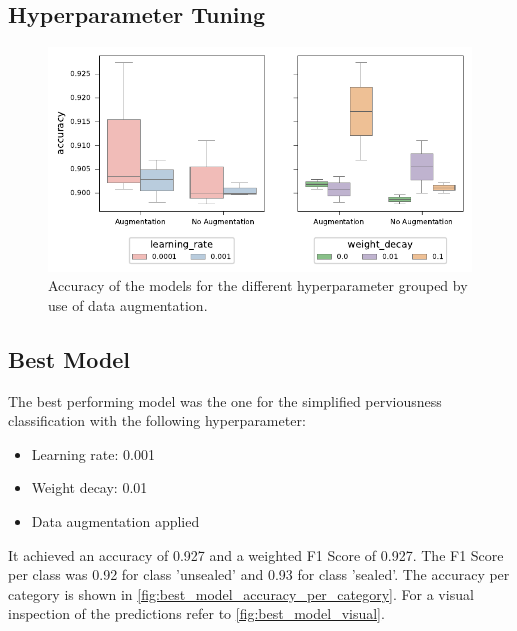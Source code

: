 \subsection{Hyperparameter Tuning}%

\begin{figure}[H]
    \centering
    \captionsetup{width=0.8\linewidth}
    \includegraphics{figures/hp_tuning_boxplot.pdf}
    \caption{Accuracy of the models for the different hyperparameter grouped by use of data augmentation.}
    \label{fig:hp_tuning_boxplot}
\end{figure}

\subsection{Best Model}%

The best performing model was the one for the simplified perviousness classification
with the following hyperparameter:
\begin{itemize}
    \item Learning rate: 0.001
    \item Weight decay: 0.01
    \item Data augmentation applied
\end{itemize}
It achieved an accuracy of 0.927 and a weighted F1 Score of 0.927.
The F1 Score per class was 0.92 for class 'unsealed' and 0.93 for class 'sealed'.
The accuracy per category is shown in \autoref{fig:best_model_accuracy_per_category}.
For a visual inspection of the predictions refer to \autoref{fig:best_model_visual}.

